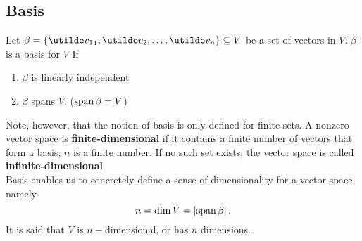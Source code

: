 \documentclass{report}
\begin{document}
\subsection{Basis}
Let $\beta = \braces{\ut{v_1}_1, \ut{v_2},\dots, \ut{v_n}}\subseteq V$ be a set of vectors in $V$. $\beta$ is a basis for $V$ If
\begin{enumerate}[label=\textbf{(B\arabic*)}]
  \item $\beta$ is linearly independent
  \item $\beta$ spans $V$. ($\operatorname{span}\beta = V$)
\end{enumerate} 
Note, however, that the notion of basis is only defined for finite sets. A nonzero vector space is \textbf{finite-dimensional} if it contains a finite number of vectors that form a basis; $n$ is a finite number. If no such set exists, the vector space is called \textbf{infinite-dimensional} \\
Basis enables us to concretely define a sense of dimensionality for a vector space, namely
$$
  n = \dim V = \left| \operatorname{span}\beta \right|.
$$
It is said that $V$ is $n{-}$dimensional, or has $n$ dimensions. \\
\end{document}
